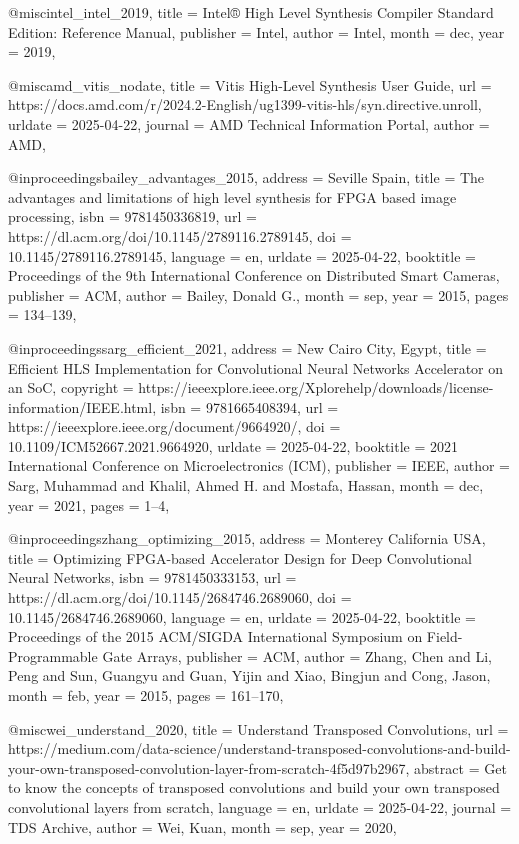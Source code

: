 @misc{intel_intel_2019,
	title = {Intel® {High} {Level} {Synthesis} {Compiler} {Standard} {Edition}: {Reference} {Manual}},
	publisher = {Intel},
	author = {{Intel}},
	month = dec,
	year = {2019},
}

@misc{amd_vitis_nodate,
	title = {Vitis {High}-{Level} {Synthesis} {User} {Guide}},
	url = {https://docs.amd.com/r/2024.2-English/ug1399-vitis-hls/syn.directive.unroll},
	urldate = {2025-04-22},
	journal = {AMD Technical Information Portal},
	author = {{AMD}},
}

@inproceedings{bailey_advantages_2015,
	address = {Seville Spain},
	title = {The advantages and limitations of high level synthesis for {FPGA} based image processing},
	isbn = {9781450336819},
	url = {https://dl.acm.org/doi/10.1145/2789116.2789145},
	doi = {10.1145/2789116.2789145},
	language = {en},
	urldate = {2025-04-22},
	booktitle = {Proceedings of the 9th {International} {Conference} on {Distributed} {Smart} {Cameras}},
	publisher = {ACM},
	author = {Bailey, Donald G.},
	month = sep,
	year = {2015},
	pages = {134--139},
}

@inproceedings{sarg_efficient_2021,
	address = {New Cairo City, Egypt},
	title = {Efficient {HLS} {Implementation} for {Convolutional} {Neural} {Networks} {Accelerator} on an {SoC}},
	copyright = {https://ieeexplore.ieee.org/Xplorehelp/downloads/license-information/IEEE.html},
	isbn = {9781665408394},
	url = {https://ieeexplore.ieee.org/document/9664920/},
	doi = {10.1109/ICM52667.2021.9664920},
	urldate = {2025-04-22},
	booktitle = {2021 {International} {Conference} on {Microelectronics} ({ICM})},
	publisher = {IEEE},
	author = {Sarg, Muhammad and Khalil, Ahmed H. and Mostafa, Hassan},
	month = dec,
	year = {2021},
	pages = {1--4},
}

@inproceedings{zhang_optimizing_2015,
	address = {Monterey California USA},
	title = {Optimizing {FPGA}-based {Accelerator} {Design} for {Deep} {Convolutional} {Neural} {Networks}},
	isbn = {9781450333153},
	url = {https://dl.acm.org/doi/10.1145/2684746.2689060},
	doi = {10.1145/2684746.2689060},
	language = {en},
	urldate = {2025-04-22},
	booktitle = {Proceedings of the 2015 {ACM}/{SIGDA} {International} {Symposium} on {Field}-{Programmable} {Gate} {Arrays}},
	publisher = {ACM},
	author = {Zhang, Chen and Li, Peng and Sun, Guangyu and Guan, Yijin and Xiao, Bingjun and Cong, Jason},
	month = feb,
	year = {2015},
	pages = {161--170},
}

@misc{wei_understand_2020,
	title = {Understand {Transposed} {Convolutions}},
	url = {https://medium.com/data-science/understand-transposed-convolutions-and-build-your-own-transposed-convolution-layer-from-scratch-4f5d97b2967},
	abstract = {Get to know the concepts of transposed convolutions and build your own transposed convolutional layers from scratch},
	language = {en},
	urldate = {2025-04-22},
	journal = {TDS Archive},
	author = {Wei, Kuan},
	month = sep,
	year = {2020},
}

